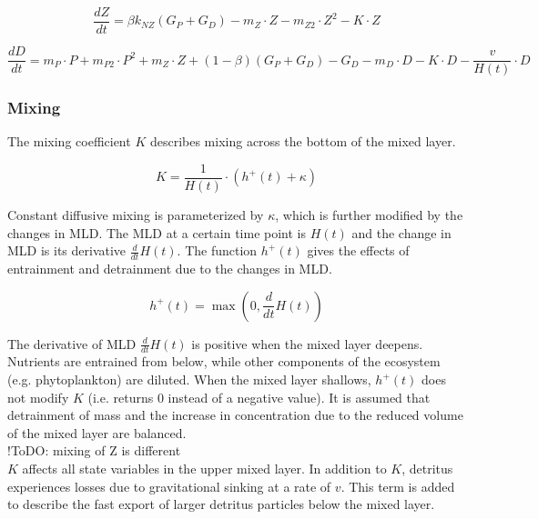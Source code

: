 \documentclass[template.tex]{subfiles}
\begin{document}
\begin{equation}
    \frac{d Z}{d t} =
    \beta k_{NZ}(G_P + G_D) %
    - m_Z \cdot Z %
    - m_{Z2} \cdot Z^2 %
    - K \cdot Z %
\end{equation}

\begin{equation}
    \frac{d D}{d t} = 
    m_P \cdot P %
    + m_{P2} \cdot P^2 %
    + m_Z \cdot Z %
    + (1 - \beta)(G_P + G_D) %
    - G_D %
    - m_D \cdot D %
    - K \cdot D %
    - \frac{v}{H(t)} \cdot D %
\end{equation}



\subsubsection{Mixing}

The mixing coefficient $K$ describes mixing across the bottom of the mixed layer.

\begin{equation}
    K = \frac{1}{H(t)} \cdot \left(h^{+}(t) + \kappa\right)
\end{equation}

Constant diffusive mixing is parameterized by $\kappa$, which is further modified by the changes in MLD. The MLD at a certain time point is $H(t)$ and the change in MLD is its derivative $\frac{d}{d t} H(t)$. The function $h^{+}(t)$ gives the effects of entrainment and detrainment due to the changes in MLD.

\begin{equation}
    h^{+}(t) = \max\left(0, \frac{d}{d t} H(t)\right)
\end{equation}

The derivative of MLD $\frac{d}{d t} H(t)$ is positive when the mixed layer deepens. Nutrients are entrained from below, while other components of the ecosystem (e.g. phytoplankton) are diluted. When the mixed layer shallows, $h^{+}(t)$ does not modify $K$ (i.e. returns 0 instead of a negative value). It is assumed that detrainment of mass and the increase in concentration due to the reduced volume of the mixed layer are balanced.
\\ !ToDO: mixing of Z is different \\
$K$ affects all state variables in the upper mixed layer. In addition to $K$, detritus experiences losses due to gravitational sinking at a rate of $v$. This term is added to describe the fast export of larger detritus particles below the mixed layer. 
\end{document}
